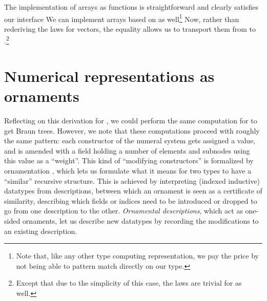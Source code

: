 The implementation of arrays as functions is straightforward
and clearly satisfies our interface
We can implement arrays based on  as well\footnote{Note that, like any other type computing representation, we pay the price by not being able to pattern match directly on our type.}
Now, rather than rederiving the laws for vectors, the equality allows us to transport them from  to .\footnote{Except that due to the simplicity of this case, the laws are trivial for  as well.}

\section{Numerical representations as ornaments}\label{sec:ornaments}
Reflecting on this derivation for \bN{}, we could perform the same computation for \bL{} to get Braun trees. However, we note that these computations proceed with roughly the same pattern: each constructor of the numeral system gets assigned a value, and is amended with a field holding a number of elements and subnodes using this value as a ``weight''. This kind of ``modifying constructors'' is formalized by ornamentation \cite{progorn}, which lets us formulate what it means for two types to have a ``similar'' recursive structure. This is achieved by interpreting (indexed inductive) datatypes from descriptions, between which an ornament is seen as a certificate of similarity, describing which fields or indices need to be introduced or dropped to go from one description to the other. \textit{Ornamental descriptions}, which act as one-sided ornaments, let us describe new datatypes by recording the modifications to an existing description.

